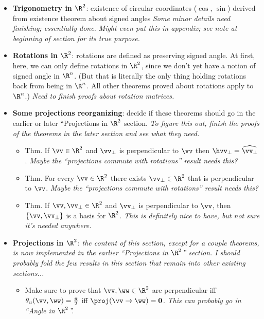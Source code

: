 \begin{itemize}
\begin{itemize}
\begin{itemize}
		\end{itemize}
		\item End of angle section includes a ``For dot product section'' subsubsection; keep this in mind.
	\end{itemize}
	\item \textbf{Trigonometry in $\R^2$}: existence of circular coordinates ($\cos$, $\sin$) derived from existence theorem about signed angles \textit{Some minor details need finishing; essentially done.} \textit{Might even put this in appendix; see note at beginning of section for its true purpose.}
	\item \textbf{Rotations in $\R^2$}: rotations are defined as preserving signed angle. At first, here, we can only define rotations in $\R^2$, since we don't yet have a notion of signed angle in $\R^n$. (But that is literally the only thing holding rotations back from being in $\R^n$. All other theorems proved about rotations apply to $\R^n$.) \textit{Need to finish proofs about rotation matrices.}
	\item \textbf{Some projections reorganizing}: decide if these theorems should go in the earlier or later ``Projections in $\R^2$ section. \textit{To figure this out, finish the proofs of the theorems in the later section and see what they need.}
	\begin{itemize}
		\item Thm. If $\vv \in \R^2$ and $\vv_\perp$ is perpendicular to $\vv$ then $\hvv_\perp = \widehat{\vv_\perp}$. \textit{Maybe the ``projections commute with rotations'' result needs this?}
		\item Thm. For every $\vv \in \R^2$ there exists $\vv_\perp \in \R^2$ that is perpendicular to $\vv$. \textit{Maybe the ``projections commute with rotations'' result needs this?}
		\item Thm. If $\vv, \vv_\perp \in \R^2$ and $\vv_\perp$ is perpendicular to $\vv$, then $\{\vv, \vv_\perp\}$ is a basis for $\R^2$. \textit{This is definitely nice to have, but not sure it's needed anywhere.}
	\end{itemize}
	\item \textbf{Projections in $\R^2$}: \textit{the content of this section, except for a couple theorems, is now implemented in the earlier ``Projections in $\R^2$'' section. I should probably fold the few results in this section that remain into other existing sections...}
	\begin{itemize}
		\item Make sure to prove that $\vv, \ww \in \R^2$ are perpendicular iff $\theta_u(\vv, \ww) = \frac{\pi}{2}$ iff $\proj(\vv \rightarrow \ww) = \mathbf{0}$. \textit{This can probably go in ``Angle in $\R^2$''.}

\end{itemize}
\end{itemize}
